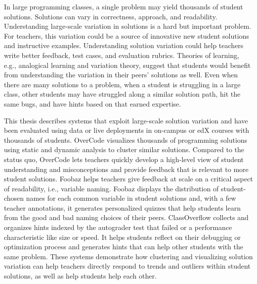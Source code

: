 %
%
%

In large programming classes, a single problem may yield thousands of student solutions. Solutions can vary in correctness, approach, and readability. Understanding large-scale variation in solutions is a hard but important problem. For teachers, this variation could be a source of innovative new student solutions and instructive examples. Understanding solution variation could help teachers write better feedback, test cases, and evaluation rubrics. Theories of learning, e.g., analogical learning and variation theory, suggest that students would benefit from understanding the variation in their peers' solutions as well. Even when there are many solutions to a problem, when a student is struggling in a large class, other students may have struggled along a similar solution path, hit the same bugs, and have hints based on that earned expertise.

This thesis describes systems that exploit large-scale solution variation and have been evaluated using data or live deployments in on-campus or edX courses with thousands of students. OverCode visualizes thousands of programming solutions using static and dynamic analysis to cluster similar solutions. Compared to the status quo, OverCode lets teachers quickly develop a high-level view of student understanding and misconceptions and provide feedback that is relevant to more student solutions. Foobaz helps teachers give feedback at scale on a critical aspect of readability, i.e., variable naming. Foobaz displays the distribution of student-chosen names for each common variable in student solutions and, with a few teacher annotations, it generates personalized quizzes that help students learn from the good and bad naming choices of their peers. ClassOverflow collects and organizes hints indexed by the autograder test that failed or a performance characteristic like size or speed. It helps students reflect on their debugging or optimization process and generates hints that can help other students with the same problem. These systems demonstrate how clustering and visualizing solution variation can help teachers directly respond to trends and outliers within student solutions, as well as help students help each other. %


